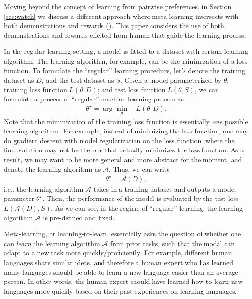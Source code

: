 \documentclass[
  letterpaper,
  DIV=11,
  numbers=noendperiod,
  oneside]{scrreprt}
\theoremstyle{remark}
\begin{document}
Moving beyond the concept of learning from pairwise preferences, in
Section \hyperref[sec:watch]{{[}sec:watch{]}} we discuss a different
approach where meta-learning intersects with both demonstrations and
rewards (). This paper
considers the use of both demonstrations and rewards elicited from human
that guide the learning process.

In the regular learning setting, a model is fitted to a dataset with
certain learning algorithm. The learning algorithm, for example, can be
the minimization of a loss function. To formulate the ``regular''
learning procedure, let's denote the training dataset as \(D\), and the
test dataset as \(S\). Given a model parameterized by \(\theta\);
training loss function \(L(\theta, D)\); and test loss function
\(L(\theta, S)\), we can formulate a process of ``regular'' machine
learning process as \[\begin{aligned}
    \theta^\star = \arg\min_\theta\quad L(\theta, D).
\end{aligned}\] Note that the minimization of the training loss function
is essentially \emph{one} possible learning algorithm. For example,
instead of minimizing the loss function, one may do gradient descent
with model regularization on the loss function, where the final solution
may not be the one that actually minimizes the loss function. As a
result, we may want to be more general and more abstract for the moment,
and denote the learning algorithm as \(\mathcal{A}\). Thus, we can write
\[\begin{aligned}
    \theta^\star = \mathcal{A}(D),
\end{aligned}\] i.e., the learning algorithm \(\mathcal{A}\) takes in a
training dataset and outputs a model parameter \(\theta^\star\). Then,
the performance of the model is evaluated by the test loss
\(L(\mathcal{A}(D), S)\). As we can see, in the regime of ``regular''
learning, the learning algorithm \(\mathcal{A}\) is pre-defined and
fixed.

Meta-learning, or learning-to-learn, essentially asks the question of
whether one can \emph{learn} the learning algorithm \(\mathcal{A}\) from
prior tasks, such that the modal can adapt to a new task more
quickly/proficiently. For example, different human languages share
similar ideas, and therefore a human expert who has learned many
languages should be able to learn a new language easier than an average
person. In other words, the human expert should have learned how to
learn new languages more quickly based on their past experiences on
learning languages.
\end{document}
